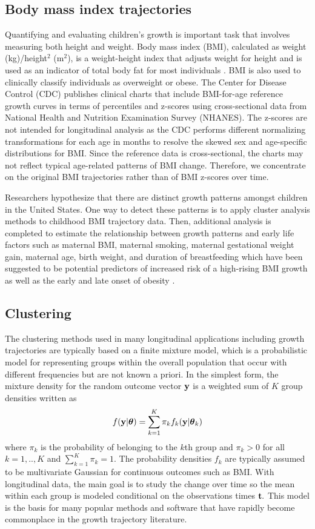 \subsection{Body mass index trajectories}
Quantifying and evaluating children's growth is important task that involves measuring both height and weight. Body mass index (BMI), calculated as weight (kg)/height$^{2}$ (m$^{2}$), is a weight-height index that adjusts weight for height and is  used as an indicator of total body fat for most individuals \cite{roche1981}. BMI is also used to clinically classify individuals as overweight or obese. The Center for Disease Control (CDC) publishes clinical charts that include BMI-for-age reference growth curves in terms of percentiles and z-scores using cross-sectional data from National Health and Nutrition Examination Survey (NHANES). The z-scores are not intended for longitudinal analysis as the CDC performs different normalizing transformations for each age in months to resolve the skewed sex and age-specific distributions for BMI. Since the reference data is cross-sectional, the charts may not reflect typical age-related patterns of BMI change. Therefore, we concentrate on the original BMI trajectories rather than of BMI z-scores over time.

Researchers hypothesize that there are distinct growth patterns amongst children in the United States. One way to detect these patterns is to apply cluster analysis methods to childhood BMI trajectory data. Then, additional analysis is completed to estimate the relationship between growth patterns and early life factors such as maternal BMI, maternal smoking, maternal gestational weight gain, maternal age, birth weight, and duration of breastfeeding which have been suggested to be potential predictors of increased risk of a high-rising BMI growth as well as the early and late onset of obesity \cite{pryor2011,carter2012,li2007}.

\subsection{Clustering}
The clustering methods used in many longitudinal applications including growth trajectories are typically based on a finite mixture model, which is a probabilistic model for representing groups within the overall population that occur with different frequencies but are not known a priori. In the simplest form, the mixture density for the random outcome vector $\mathbf y$ is a weighted sum of $K$ group densities written as
$$f(\mathbf y|\boldsymbol\theta) = \sum^{K}_{k=1}\pi_{k}f_{k}(\mathbf y|\boldsymbol\theta_{k})$$
where $\pi_{k}$ is the probability of belonging to the $k$th group and $\pi_{k}>0$ for all $k=1,..,K$ and $\sum^{K}_{k=1}\pi_{k}=1$. The probability densities $f_{k}$ are typically assumed to be multivariate Gaussian for continuous outcomes such as BMI. With longitudinal data, the main goal is to study the change over time so the mean within each group is modeled conditional on the observations times $\mathbf t.$  This model is the basis for many popular methods and software that have rapidly become commonplace in the growth trajectory literature.

